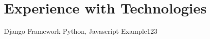 \section*{Experience with Technologies}
\tech
  {Django Framework}
  {Python, Javascript}
  {Example123}
